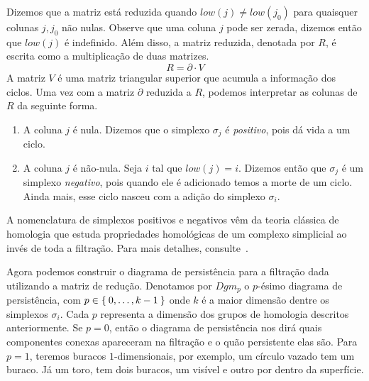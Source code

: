 Dizemos que a matriz está reduzida quando $low(j) \neq low(j_0)$ para quaisquer
colunas $j,j_0$ não nulas. Observe que uma coluna $j$ pode ser zerada, dizemos
então que $low(j)$ é indefinido. Além disso, a matriz reduzida, denotada por
$R$, é escrita como a multiplicação de duas matrizes.
\begin{equation}
  \label{eq:red_matrix}
  R = \partial \cdot V
\end{equation}
A matriz $V$ é uma matriz triangular superior que acumula a informação dos
ciclos. Uma vez com a matriz $\partial$ reduzida a $R$, podemos interpretar as
colunas de $R$ da seguinte forma.
\begin{enumerate}
  \item A coluna $j$ é nula. Dizemos que o simplexo $\sigma_j$
  é \textit{positivo}, pois dá vida a um ciclo.
  \item A coluna $j$ é não-nula. Seja $i$ tal que $low(j)=i$.
  Dizemos então que $\sigma_j$ é um simplexo \textit{negativo}, pois quando
  ele é adicionado temos a morte de um ciclo. Ainda mais, esse ciclo nasceu com
  a adição do simplexo $\sigma_i$.
\end{enumerate}
A nomenclatura de simplexos positivos e negativos vêm da teoria clássica de homologia
que estuda propriedades homológicas de um complexo simplicial ao invés de toda
a filtração. Para mais detalhes, consulte~\cite{edelsbrunner2010computational}.

Agora podemos construir o diagrama de persistência para a filtração dada
utilizando a matriz de redução. Denotamos por $Dgm_p$ o $p$-ésimo diagrama
de persistência, com $p \in \Set{0,\dots,k-1}$ onde $k$ é a maior dimensão
dentre os simplexos $\sigma_i$. Cada $p$ representa a dimensão dos grupos de
homologia descritos anteriormente. Se $p=0$, então o diagrama de persistência
nos dirá quais componentes conexas apareceram na filtração e o quão persistente
elas são. Para $p=1$, teremos buracos $1$-dimensionais, por exemplo, um círculo
vazado tem um buraco. Já um toro, tem dois buracos, um visível e outro por
dentro da superfície.

